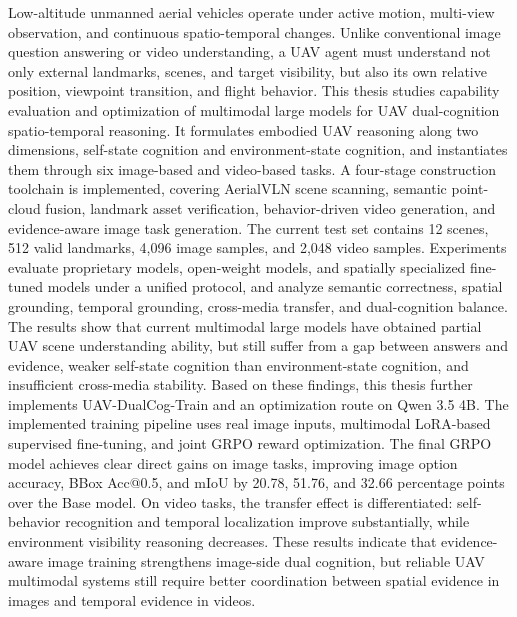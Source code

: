 \begin{engabstract}
    Low-altitude unmanned aerial vehicles operate under active motion, multi-view observation, and continuous spatio-temporal changes. Unlike conventional image question answering or video understanding, a UAV agent must understand not only external landmarks, scenes, and target visibility, but also its own relative position, viewpoint transition, and flight behavior. This thesis studies capability evaluation and optimization of multimodal large models for UAV dual-cognition spatio-temporal reasoning. It formulates embodied UAV reasoning along two dimensions, self-state cognition and environment-state cognition, and instantiates them through six image-based and video-based tasks. A four-stage construction toolchain is implemented, covering AerialVLN scene scanning, semantic point-cloud fusion, landmark asset verification, behavior-driven video generation, and evidence-aware image task generation. The current test set contains 12 scenes, 512 valid landmarks, 4,096 image samples, and 2,048 video samples. Experiments evaluate proprietary models, open-weight models, and spatially specialized fine-tuned models under a unified protocol, and analyze semantic correctness, spatial grounding, temporal grounding, cross-media transfer, and dual-cognition balance. The results show that current multimodal large models have obtained partial UAV scene understanding ability, but still suffer from a gap between answers and evidence, weaker self-state cognition than environment-state cognition, and insufficient cross-media stability. Based on these findings, this thesis further implements UAV-DualCog-Train and an optimization route on Qwen 3.5 4B. The implemented training pipeline uses real image inputs, multimodal LoRA-based supervised fine-tuning, and joint GRPO reward optimization. The final GRPO model achieves clear direct gains on image tasks, improving image option accuracy, BBox Acc@0.5, and mIoU by 20.78, 51.76, and 32.66 percentage points over the Base model. On video tasks, the transfer effect is differentiated: self-behavior recognition and temporal localization improve substantially, while environment visibility reasoning decreases. These results indicate that evidence-aware image training strengthens image-side dual cognition, but reliable UAV multimodal systems still require better coordination between spatial evidence in images and temporal evidence in videos.
\end{engabstract}
